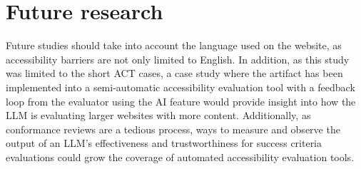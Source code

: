 \section{Future research}

Future studies should take into account the language used on the website, as accessibility barriers are not only limited to English. In addition, as this study was limited to the short ACT cases, a case study where the artifact has been implemented into a semi-automatic accessibility evaluation tool with a feedback loop from the evaluator using the AI feature would provide insight into how the LLM is evaluating larger websites with more content. Additionally, as conformance reviews are a tedious process, ways to measure and observe the output of an LLM's effectiveness and trustworthiness for success criteria evaluations could grow the coverage of automated accessibility evaluation tools.

